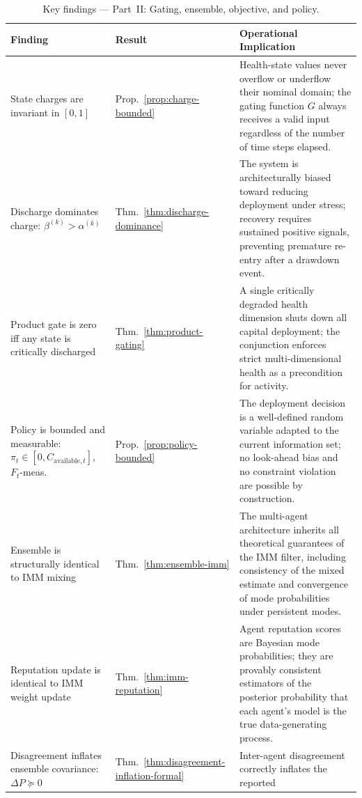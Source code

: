 \documentclass[12pt,openany]{book}
\numberwithin{equation}{chapter}
\theoremstyle{plain}
\theoremstyle{definition}
\theoremstyle{remark}
\def\mathcal#1{#1}%
\begin{document}
\begin{table}[H]
\centering
\caption{Key findings --- Part~II: Gating, ensemble, objective,
         and policy.}
\label{tab:key-findings-b}
\small
\begin{tabularx}{\linewidth}{@{} p{3.2cm} l X @{}}
\toprule
\textbf{Finding} & \textbf{Result} & \textbf{Operational
  Implication} \\
\midrule
State charges are invariant in $[0,1]$
  & Prop.~\ref{prop:charge-bounded}
  & Health-state values never overflow or underflow their
    nominal domain; the gating function $G$ always receives
    a valid input regardless of the number of time steps
    elapsed. \\
\midrule
Discharge dominates charge:
$\beta^{(k)} > \alpha^{(k)}$
  & Thm.~\ref{thm:discharge-dominance}
  & The system is architecturally biased toward reducing
    deployment under stress; recovery requires sustained
    positive signals, preventing premature re-entry after
    a drawdown event. \\
\midrule
Product gate is zero iff any state
is critically discharged
  & Thm.~\ref{thm:product-gating}
  & A single critically degraded health dimension shuts
    down all capital deployment; the conjunction enforces
    strict multi-dimensional health as a precondition for
    activity. \\
\midrule
Policy is bounded and measurable:
$\pi_t \in [0, C_{\mathrm{available},t}]$, $\mathcal{F}_t$-meas.
  & Prop.~\ref{prop:policy-bounded}
  & The deployment decision is a well-defined random
    variable adapted to the current information set;
    no look-ahead bias and no constraint violation are
    possible by construction. \\
\midrule
Ensemble is structurally identical
to IMM mixing
  & Thm.~\ref{thm:ensemble-imm}
  & The multi-agent architecture inherits all theoretical
    guarantees of the IMM filter, including consistency of
    the mixed estimate and convergence of mode probabilities
    under persistent modes. \\
\midrule
Reputation update is identical to
IMM weight update
  & Thm.~\ref{thm:imm-reputation}
  & Agent reputation scores are Bayesian mode probabilities;
    they are provably consistent estimators of the posterior
    probability that each agent's model is the true
    data-generating process. \\
\midrule
Disagreement inflates ensemble
covariance: $\Delta P \succeq 0$
  & Thm.~\ref{thm:disagreement-inflation-formal}
  & Inter-agent disagreement correctly inflates the reported

\end{tabularx}
\end{table}
\end{document}
